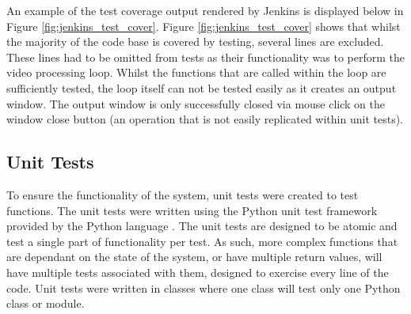 An example of the test coverage output rendered by Jenkins is displayed below in Figure \ref{fig:jenkins_test_cover}. Figure \ref{fig:jenkins_test_cover} shows that whilst the majority of the code base is covered by testing, several lines are excluded. These lines had to be omitted from tests as their functionality was to perform the video processing loop. Whilst the functions that are called within the loop are sufficiently tested, the loop itself can not be tested easily as it creates an output window. The output window is only successfully closed via mouse click on the window close button (an operation that is not easily replicated within unit tests).
\begin{figure}[h!]
\end{figure}
 

\subsection{Unit Tests}
To ensure the functionality of the system, unit tests were created to test functions. The unit tests were written using the Python unit test framework provided by the Python language \cite{python_unittest}. The unit tests are designed to be atomic and test a single part of functionality per test. As such, more complex functions that are dependant on the state of the system, or have multiple return values, will have multiple tests associated with them, designed to exercise every line of the code. Unit tests were written in classes where one class will test only one Python class or module.

